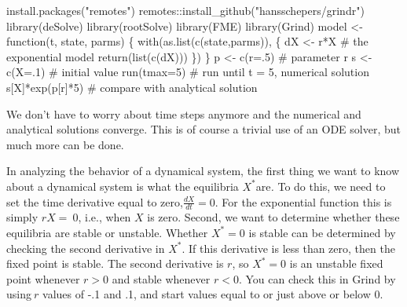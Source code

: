 \documentclass[
  letterpaper,
]{scrbook}
\newenvironment{Shaded}{\begin{snugshade}}{\end{snugshade}}
\newcommand{\AttributeTok}[1]{\textcolor[rgb]{0.40,0.45,0.13}{#1}}
\newcommand{\CommentTok}[1]{\textcolor[rgb]{0.37,0.37,0.37}{#1}}
\newcommand{\ControlFlowTok}[1]{\textcolor[rgb]{0.00,0.23,0.31}{#1}}
\newcommand{\DecValTok}[1]{\textcolor[rgb]{0.68,0.00,0.00}{#1}}
\newcommand{\FunctionTok}[1]{\textcolor[rgb]{0.28,0.35,0.67}{#1}}
\newcommand{\NormalTok}[1]{\textcolor[rgb]{0.00,0.23,0.31}{#1}}
\newcommand{\OtherTok}[1]{\textcolor[rgb]{0.00,0.23,0.31}{#1}}
\newcommand{\SpecialCharTok}[1]{\textcolor[rgb]{0.37,0.37,0.37}{#1}}
\newcommand{\StringTok}[1]{\textcolor[rgb]{0.13,0.47,0.30}{#1}}
\begin{document}
\begin{Shaded}
\begin{Highlighting}[]
\FunctionTok{install.packages}\NormalTok{(}\StringTok{"remotes"}\NormalTok{)}
\NormalTok{remotes}\SpecialCharTok{::}\FunctionTok{install\_github}\NormalTok{(}\StringTok{"hansschepers/grindr"}\NormalTok{)}
\FunctionTok{library}\NormalTok{(deSolve)}
\FunctionTok{library}\NormalTok{(rootSolve)}
\FunctionTok{library}\NormalTok{(FME)}
\FunctionTok{library}\NormalTok{(Grind)}
\NormalTok{model }\OtherTok{\textless{}{-}} \ControlFlowTok{function}\NormalTok{(t, state, parms) \{}
  \FunctionTok{with}\NormalTok{(}\FunctionTok{as.list}\NormalTok{(}\FunctionTok{c}\NormalTok{(state,parms)), \{}
\NormalTok{    dX }\OtherTok{\textless{}{-}}\NormalTok{ r}\SpecialCharTok{*}\NormalTok{X            }\CommentTok{\# the exponential model}
      \FunctionTok{return}\NormalTok{(}\FunctionTok{list}\NormalTok{(}\FunctionTok{c}\NormalTok{(dX)))}
\NormalTok{  \})}
\NormalTok{\}}
\NormalTok{p }\OtherTok{\textless{}{-}} \FunctionTok{c}\NormalTok{(}\AttributeTok{r=}\NormalTok{.}\DecValTok{5}\NormalTok{) }\CommentTok{\# parameter r}
\NormalTok{s }\OtherTok{\textless{}{-}} \FunctionTok{c}\NormalTok{(}\AttributeTok{X=}\NormalTok{.}\DecValTok{1}\NormalTok{) }\CommentTok{\# initial value}
\FunctionTok{run}\NormalTok{(}\AttributeTok{tmax=}\DecValTok{5}\NormalTok{) }\CommentTok{\# run until t = 5, numerical solution}
\NormalTok{s[}\StringTok{\textquotesingle{}X\textquotesingle{}}\NormalTok{]}\SpecialCharTok{*}\FunctionTok{exp}\NormalTok{(p[}\StringTok{\textquotesingle{}r\textquotesingle{}}\NormalTok{]}\SpecialCharTok{*}\DecValTok{5}\NormalTok{) }\CommentTok{\# compare with analytical solution}
\end{Highlighting}
\end{Shaded}

We don't have to worry about time steps anymore and the numerical and
analytical solutions converge. This is of course a trivial use of an ODE
solver, but much more can be done.

In analyzing the behavior of a dynamical system, the first thing we want
to know about a dynamical system is what the equilibria
\(X^{*}\)are\emph{.} To do this, we need to set the time derivative
equal to zero,\(\frac{dX}{dt} = 0.\) For the exponential function this
is simply \(rX = \ 0\), i.e., when \(X\) is zero. Second, we want to
determine whether these equilibria are stable or unstable. Whether
\(X^{*}=0\) is stable can be determined by checking the second
derivative in \(X^{*}\). If this derivative is less than zero, then the
fixed point is stable. The second derivative is \(r\), so \(X^{*} = 0\)
is an unstable fixed point whenever \(r > 0\) and stable whenever
\(r < 0\). You can check this in Grind by using\(\ r\) values of -.1 and
.1, and start values equal to or just above or below 0.
\end{document}
